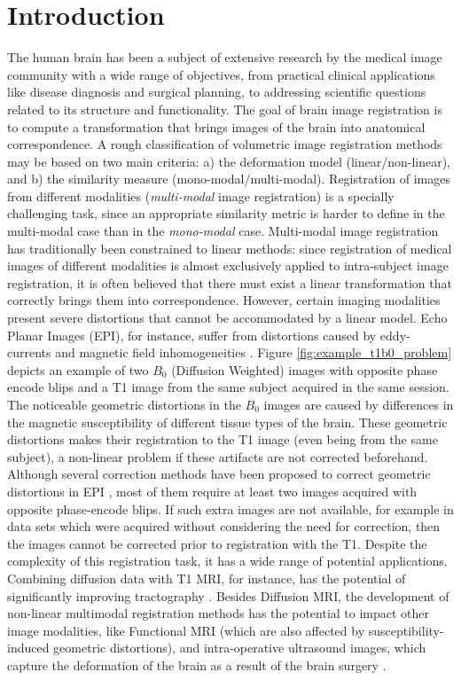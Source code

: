 \vspace{-0.5cm}
\section{Introduction}
The human brain has been a subject of extensive research by the medical image community with a wide range of objectives, from practical clinical applications like disease diagnosis and surgical planning, to addressing scientific questions related to its structure and functionality. The goal of brain image registration is to compute a transformation that brings images of the brain into anatomical correspondence. A rough classification of volumetric image registration methods may be based on two main criteria: a) the deformation model (linear/non-linear), and b) the similarity measure (mono-modal/multi-modal). Registration of images from different modalities (\emph{multi-modal} image registration) is a specially challenging task, since an appropriate similarity metric is harder to define in the multi-modal case than in the \emph{mono-modal} case. Multi-modal image registration has traditionally been constrained to linear methods: since registration of medical images of different modalities is almost exclusively applied to intra-subject image registration, it is often believed that there must exist a linear transformation that correctly brings them into correspondence. However, certain imaging modalities present severe distortions that cannot be accommodated by a linear model. Echo Planar Images (EPI), for instance, suffer from distortions caused by eddy-currents and magnetic field inhomogeneities \cite{Tournier2011, Andersson2003}. Figure \ref{fig:example_t1b0_problem} depicts an example of two $B_{0}$ (Diffusion Weighted) images with opposite phase encode blips and a T1 image from the same subject acquired in the same session. The noticeable geometric distortions in the $B_{0}$ images are caused by differences in the magnetic susceptibility of different tissue types of the brain. These geometric distortions makes their registration to the T1 image (even being from the same subject), a non-linear problem if these artifacts are not corrected beforehand. Although several correction methods have been proposed to correct geometric distortions in EPI \cite{Andersson2003, Holland2010, Ruthotto, Irfanoglu2014}, most of them require at least two images acquired with opposite phase-encode blips. If such extra images are not available, for example in data sets which were acquired without considering the need for correction, then the images cannot be corrected prior to registration with the T1. Despite the complexity of this registration task, it has a wide range of potential applications. Combining diffusion data with T1 MRI, for instance, has the potential of significantly improving tractography \cite{Smith2012, Girard2014}. Besides Diffusion MRI, the development of non-linear multimodal registration methods has the potential to impact other image modalities, like Functional MRI (which are also affected by susceptibility-induced geometric distortions), and intra-operative ultrasound images, which capture the deformation of the brain as a result of the brain surgery \cite{Rivaz2015, DeNigris2012}.
